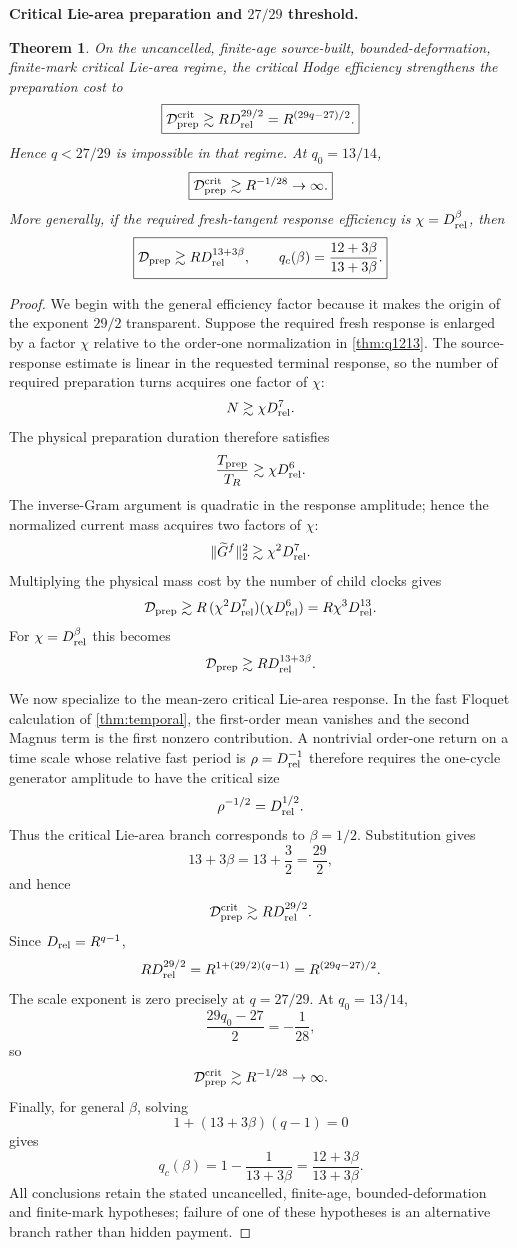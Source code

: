 \documentclass[11pt]{article}
\newtheorem{theorem}{Theorem}[section]
\theoremstyle{definition}\newtheorem{definition}[theorem]{Definition}
\theoremstyle{remark}\newtheorem{remark}[theorem]{Remark}
\begin{document}
\medskip
\noindent\textbf{Critical Lie-area preparation and $27/29$ threshold.}
\begin{theorem}\label{thm:q2729}
On the uncancelled, finite-age source-built, bounded-deformation, finite-mark
critical Lie-area regime, the critical Hodge efficiency strengthens the
preparation cost to
\[
\boxed{
\mathcal D_{\rm prep}^{\rm crit}
\gtrsim R D_{\rm rel}^{29/2}
=R^{(29q-27)/2}.}
\]
Hence $q<27/29$ is impossible in that regime.  At $q_0=13/14$,
\[
\boxed{\mathcal D_{\rm prep}^{\rm crit}\gtrsim R^{-1/28}\to\infty.}
\]
More generally, if the required fresh-tangent response efficiency is
$\chi=D_{\rm rel}^{\beta}$, then
\[
\boxed{
\mathcal D_{\rm prep}
\gtrsim R D_{\rm rel}^{13+3\beta},
\qquad
q_c(\beta)=\frac{12+3\beta}{13+3\beta}.}
\]
\end{theorem}
\begin{proof}
We begin with the general efficiency factor because it makes the origin of the
exponent $29/2$ transparent.  Suppose the required fresh response is enlarged
by a factor $\chi$ relative to the order-one normalization in
\cref{thm:q1213}.  The source-response estimate is linear in the requested
terminal response, so the number of required preparation turns acquires one
factor of $\chi$:
\[
 N\gtrsim \chi D_{\rm rel}^7.
\]
The physical preparation duration therefore satisfies
\[
 \frac{T_{\rm prep}}{T_R}
 \gtrsim \chi D_{\rm rel}^6.
\]
The inverse-Gram argument is quadratic in the response amplitude; hence the
normalized current mass acquires two factors of $\chi$:
\[
 \|\widetilde G^f\|_2^2
 \gtrsim \chi^2D_{\rm rel}^7.
\]
Multiplying the physical mass cost by the number of child clocks gives
\[
 \mathcal D_{\rm prep}
 \gtrsim
 R\,(\chi^2D_{\rm rel}^7)
 (\chi D_{\rm rel}^6)
 =R\chi^3D_{\rm rel}^{13}.
\]
For $\chi=D_{\rm rel}^{\beta}$ this becomes
\[
 \mathcal D_{\rm prep}
 \gtrsim
 R D_{\rm rel}^{13+3\beta}.
\]

We now specialize to the mean-zero critical Lie-area response.  In the fast
Floquet calculation of \cref{thm:temporal}, the first-order mean vanishes and
the second Magnus term is the first nonzero contribution.  A nontrivial
order-one return on a time scale whose relative fast period is
$\rho=D_{\rm rel}^{-1}$ therefore requires the one-cycle generator amplitude
to have the critical size
\[
 \rho^{-1/2}=D_{\rm rel}^{1/2}.
\]
Thus the critical Lie-area branch corresponds to $\beta=1/2$.  Substitution
gives
\[
 13+3\beta
 =13+\frac32
 =\frac{29}{2},
\]
and hence
\[
 \mathcal D_{\rm prep}^{\rm crit}
 \gtrsim R D_{\rm rel}^{29/2}.
\]
Since $D_{\rm rel}=R^{q-1}$,
\[
 R D_{\rm rel}^{29/2}
 =R^{1+(29/2)(q-1)}
 =R^{(29q-27)/2}.
\]
The scale exponent is zero precisely at $q=27/29$.  At $q_0=13/14$,
\[
 \frac{29q_0-27}{2}
 =-\frac1{28},
\]
so
\[
 \mathcal D_{\rm prep}^{\rm crit}
 \gtrsim R^{-1/28}\to\infty.
\]
Finally, for general $\beta$, solving
\[
 1+(13+3\beta)(q-1)=0
\]
gives
\[
 q_c(\beta)
 =1-\frac1{13+3\beta}
 =\frac{12+3\beta}{13+3\beta}.
\]
All conclusions retain the stated uncancelled, finite-age,
bounded-deformation and finite-mark hypotheses; failure of one of these
hypotheses is an alternative branch rather than hidden payment.
\end{proof}
\end{document}

